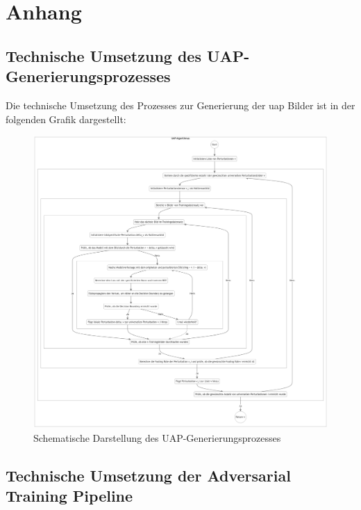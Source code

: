 \section*{Anhang}

\subsection*{Technische Umsetzung des UAP-Generierungsprozesses}

Die technische Umsetzung des Prozesses zur Generierung der \acrshort{uap} Bilder ist in der folgenden Grafik dargestellt:

\begin{figure}[H]
    \centering
    \includegraphics[width=\linewidth]{01-images/04-methodik/UAP_ALG.png}
    \caption{Schematische Darstellung des UAP-Generierungsprozesses}
    \label{fig:05-uap_algorithm}
\end{figure}

\newpage

\subsection*{Technische Umsetzung der Adversarial Training Pipeline}

